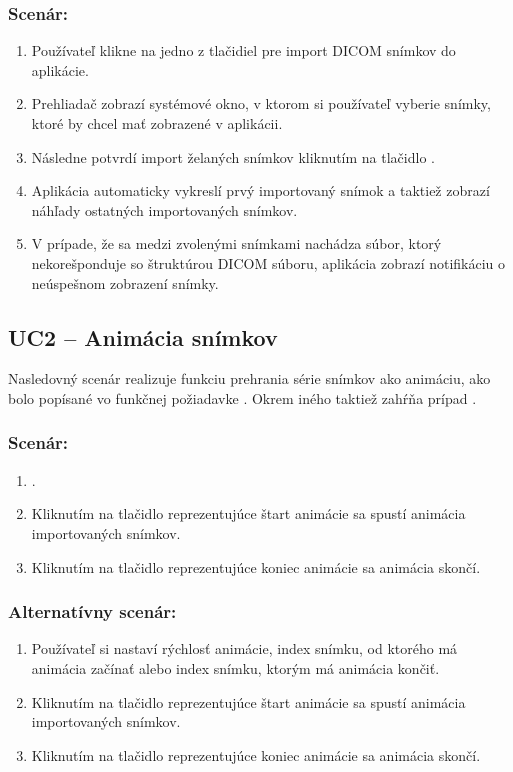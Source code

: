 \subsubsection*{Scenár:}
\begin {enumerate}
\item {Používateľ klikne na jedno z tlačidiel pre import DICOM snímkov do aplikácie.}
\item {Prehliadač zobrazí systémové okno, v ktorom si používateľ vyberie snímky, ktoré by chcel mať zobrazené v aplikácii.}
\item {Následne potvrdí import želaných snímkov kliknutím na tlačidlo .}
\item {Aplikácia automaticky vykreslí prvý importovaný snímok a taktiež zobrazí náhľady ostatných importovaných snímkov.}
\item {V prípade, že sa medzi zvolenými snímkami nachádza súbor, ktorý nekorešponduje so štruktúrou DICOM súboru, aplikácia zobrazí notifikáciu o neúspešnom zobrazení snímky.}
\end {enumerate}
	
\subsection {UC2 -- Animácia snímkov}
Nasledovný scenár realizuje funkciu prehrania série snímkov ako animáciu, ako bolo popísané vo funkčnej požiadavke .
Okrem iného taktiež zahŕňa prípad . 

\subsubsection*{Scenár:}
\begin {enumerate}
\item {.}
\item {Kliknutím na tlačidlo reprezentujúce štart animácie sa spustí animácia importovaných snímkov.}
\item {Kliknutím na tlačidlo reprezentujúce koniec animácie sa animácia skončí.}
\end {enumerate}

\subsubsection*{Alternatívny scenár:}
\begin {enumerate}
\item [\textbf{2.}] {Používateľ si nastaví rýchlosť animácie, index snímku, od ktorého má animácia začínať alebo index snímku, ktorým má animácia končiť.}
\item  [\textbf{3.}] {Kliknutím na tlačidlo reprezentujúce štart animácie sa spustí animácia importovaných snímkov.}
\item  [\textbf{4.}] {Kliknutím na tlačidlo reprezentujúce koniec animácie sa animácia skončí.}
\end {enumerate}

